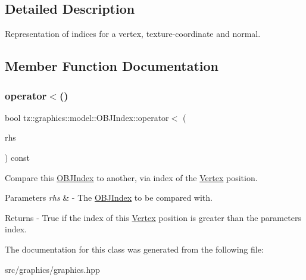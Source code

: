 \subsection{Detailed Description}
Representation of indices for a vertex, texture-\/coordinate and normal. 

\subsection{Member Function Documentation}
\mbox{\label{classtz_1_1graphics_1_1model_1_1_o_b_j_index_a5bf098fe36d35780bfb094343361ff83}} 
\subsubsection{\texorpdfstring{operator$<$()}{operator<()}}
{\footnotesize\ttfamily bool tz\+::graphics\+::model\+::\+O\+B\+J\+Index\+::operator$<$ (\begin{DoxyParamCaption}\item[{const \mbox{\hyperlink{classtz_1_1graphics_1_1model_1_1_o_b_j_index}{O\+B\+J\+Index}} \&}]{rhs }\end{DoxyParamCaption}) const\hspace{0.3cm}{\ttfamily [inline]}}

Compare this \mbox{\hyperlink{classtz_1_1graphics_1_1model_1_1_o_b_j_index}{O\+B\+J\+Index}} to another, via index of the \mbox{\hyperlink{class_vertex}{Vertex}} position. 
\begin{DoxyParams}{Parameters}
{\em rhs} & -\/ The \mbox{\hyperlink{classtz_1_1graphics_1_1model_1_1_o_b_j_index}{O\+B\+J\+Index}} to be compared with. \\
\hline
\end{DoxyParams}
\begin{DoxyReturn}{Returns}
-\/ True if the index of this \mbox{\hyperlink{class_vertex}{Vertex}} position is greater than the parameter\textquotesingle{}s index. 
\end{DoxyReturn}


The documentation for this class was generated from the following file\+:\begin{DoxyCompactItemize}
\item 
src/graphics/graphics.\+hpp\end{DoxyCompactItemize}
